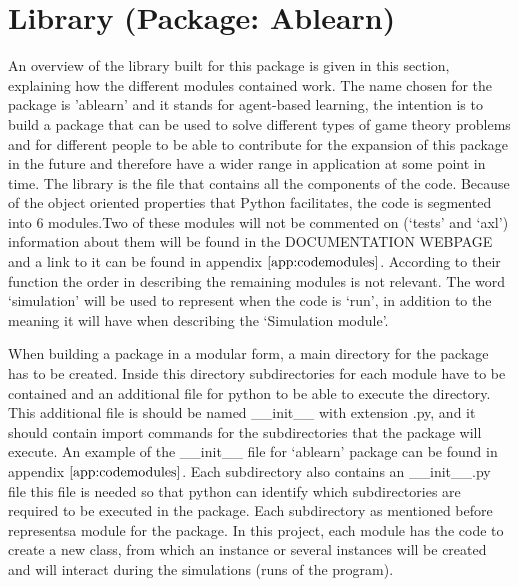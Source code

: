 \section{Library (Package: Ablearn)}\label{library_section}
An overview of the library built for this package is given in this section, explaining how the different modules contained work. The name chosen for the package is 'ablearn' and it stands for agent-based learning, the intention is to build a package that can be used to solve different types of game theory problems and for different people to be able to contribute for the expansion of this package in the future and therefore have a wider range in application at some point in time.
The library is the file that contains all the components of the code. Because of the object oriented properties that Python facilitates, the code is segmented into 6 modules.Two of these modules will not be commented on (`tests' and `axl')  information about them will be found in the DOCUMENTATION WEBPAGE and a link to it can be found in appendix $\ref{app:codemodules}$. According to their function the order in describing the remaining modules is not relevant. The word `simulation' will be used to represent when the code is `run', in addition to the meaning it will have when describing the `Simulation module'.

When building a package in a modular form, a main directory for the package has to be created. Inside this directory subdirectories for each module have to be contained and an additional file for python to be able to execute the directory. This additional file is should be named \_\_init\_\_ with extension .py, and it should contain import commands for the subdirectories that the package will execute. An example of the \_\_init\_\_ file for `ablearn' package can be found in appendix $\ref{app:codemodules}$. Each subdirectory also contains an \_\_init\_\_.py file this file is needed so that python can identify which subdirectories are required to be executed in the package. Each subdirectory as mentioned before representsa module for the package. In this project, each module has the code to create a new class, from which an instance or several instances will be created and will interact during the simulations (runs of the program). 

